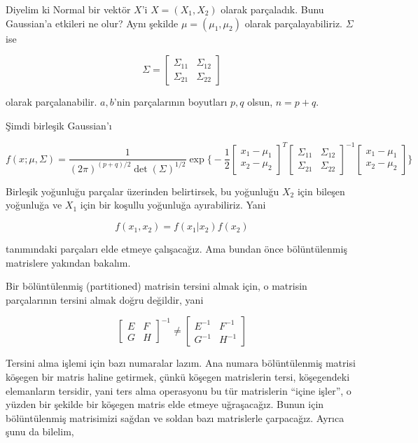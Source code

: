 \documentclass[12pt,fleqn]{article}\usepackage{../../common}
\begin{document}
Diyelim ki Normal bir vektör $X$'i $X = (X_1,X_2)$ olarak parçaladık. Bunu
Gaussian'a etkileri ne olur? Aynı şekilde $\mu = (\mu_1,\mu_2)$ olarak
parçalayabiliriz. $\Sigma$ ise

$$ \Sigma = 
\left[\begin{array}{rr}
\Sigma_{11} & \Sigma_{12}\\
\Sigma_{21} & \Sigma_{22}
\end{array}\right]
$$

olarak parçalanabilir. $a,b$'nin parçalarının boyutları $p,q$ olsun, $n = p+q$.

Şimdi birleşik Gaussian'ı 

$$
f(x;\mu,\Sigma) = 
\frac{ 1}{(2\pi)^{(p+q)/2} \det(\Sigma)^{1/2}} 
\exp 
\bigg\{ 
-\frac{ 1}{2}
\left[\begin{array}{r}
x_1 - \mu_1\\
x_2 - \mu_2
\end{array}\right]^T
\left[\begin{array}{rr}
\Sigma_{11} & \Sigma_{12}\\
\Sigma_{21} & \Sigma_{22}
\end{array}\right]^{-1}
\left[\begin{array}{r}
x_1 - \mu_1\\
x_2 - \mu_2
\end{array}\right]
\bigg\}
$$

Birleşik yoğunluğu parçalar üzerinden belirtirsek, bu yoğunluğu $X_2$ için
bileşen yoğunluğa ve $X_1$ için bir koşullu yoğunluğa ayırabiliriz. Yani 

$$ f(x_1,x_2) = f(x_1|x_2) f(x_2) $$

tanımındaki parçaları elde etmeye çalışacağız.  Ama bundan önce
bölüntülenmiş matrislere yakından bakalım. 

Bir bölüntülenmiş (partitioned) matrisin tersini almak için, o matrisin
parçalarının tersini almak doğru değildir, yani

$$ 
\left[\begin{array}{rr}
E & F \\
G & H
\end{array}\right] ^{-1} \ne
\left[\begin{array}{rr}
E^{-1} & F ^{-1}\\
G^{-1} & H^{-1}
\end{array}\right]  
 $$

Tersini alma işlemi için bazı numaralar lazım. Ana numara bölüntülenmiş matrisi 
köşegen bir matris haline getirmek, çünkü köşegen matrislerin tersi,
köşegendeki elemanların tersidir, yani ters alma operasyonu bu tür
matrislerin ``içine işler'', o yüzden bir şekilde bir köşegen matris
elde etmeye uğraşacağız. Bunun için bölüntülenmiş matrisimizi sağdan ve
soldan bazı matrislerle çarpacağız. Ayrıca şunu da bilelim, 
\end{document}
